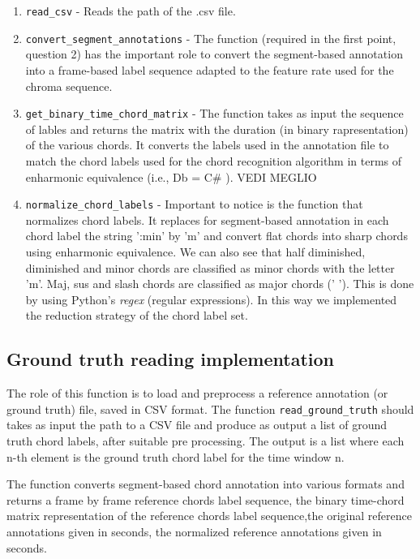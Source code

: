 \documentclass{article}
\begin{document}
\begin{enumerate}
	\item \verb|read_csv| - Reads the path of the .csv file.
	\item \verb|convert_segment_annotations| - The function (required in the first point, question 2) has the important role to convert the segment-based annotation into a frame-based label sequence adapted to the feature rate used for the chroma sequence.
	\item \verb|get_binary_time_chord_matrix| - The function takes as input the sequence of lables and returns the matrix with the duration (in binary rapresentation) of the various chords. It converts the labels used in the annotation file to match the chord labels used for the chord recognition
algorithm in terms of enharmonic equivalence (i.e., Db = C\# ).
\color{red} VEDI MEGLIO \color{black}
	\item \verb|normalize_chord_labels| - Important to notice is the function that normalizes chord labels. It replaces for segment-based annotation in each chord label the string ':min' by 'm' and convert flat chords into sharp chords using enharmonic equivalence. We can also see that half diminished, diminished and minor chords are classified as minor chords with the letter 'm'. Maj, sus and slash  chords are classified as major chords (' '). This is done by using Python's \textit{regex} (regular expressions). In this way we implemented the reduction strategy of the chord label set.
\end{enumerate}

\subsection*{Ground truth reading implementation}
The role of this function is to load and preprocess a reference annotation (or ground truth) file, saved in CSV format. The function  \verb |read_ground_truth| should takes as input the path to a CSV file and produce as output a list of ground truth chord labels, after suitable pre processing. The output is a list where each n-th element is the ground truth chord label for the time window n. 



The function converts segment-based chord annotation into various formats and returns a frame by frame reference chords label sequence, the binary time-chord matrix representation of the reference chords label sequence,the original reference annotations given in seconds, the normalized reference annotations given in seconds.
\end{document}
